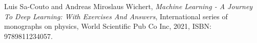 \documentclass{article}
\begin{document}
\newpage

\thispagestyle{empty}
\begin{thebibliography}{99}

Luis Sa-Couto and Andreas Miroslaus Wichert, 
\textit{Machine Learning - A Journey To Deep Learning: With Exercises And Answers}, 
International series of monographs on physics, 
World Scientific Pub Co Inc, 2021, ISBN: 9789811234057.

\end{thebibliography}

\end{document}
